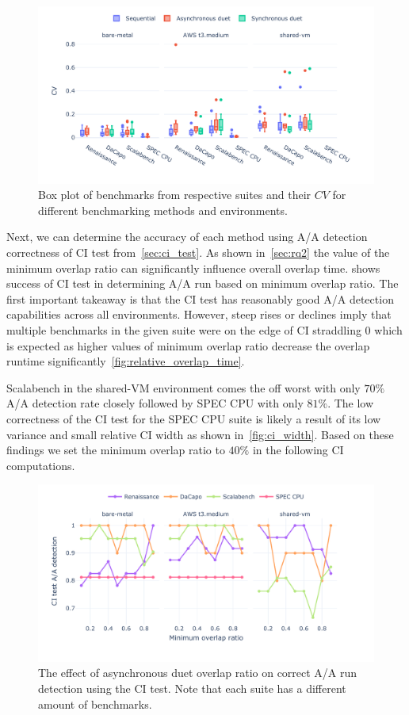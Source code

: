 \begin{figure}
	\centering
	\includegraphics[width=1\linewidth]{./figures/cv.pdf}
	\caption{
		Box plot of benchmarks from respective suites and their $CV$ for different benchmarking methods and environments.
	}
	\label{fig:cv}
\end{figure}

Next, we can determine the accuracy of each method using A/A detection correctness of CI test from~\cref{sec:ci_test}.
As shown in~\cref{sec:rq2} the value of the minimum overlap ratio can significantly influence overall overlap time.
 shows success of CI test in determining A/A run based on minimum overlap ratio.
The first important takeaway is that the CI test has reasonably good A/A detection capabilities across all environments.
However, steep rises or declines imply that multiple benchmarks in the given suite were on the edge of CI straddling $0$ which is expected as higher values of minimum overlap ratio decrease the overlap runtime significantly~\ref{fig:relative_overlap_time}.

Scalabench in the \mbox{shared-VM} environment comes the off worst with only $70\%$ A/A detection rate closely followed by SPEC CPU with only $81\%$.
The low correctness of the CI test for the SPEC CPU suite is likely a result of its low variance and small relative CI width as shown in~\cref{fig:ci_width}.
Based on these findings we set the minimum overlap ratio to $40\%$ in the following CI computations.

\begin{figure}
	\centering
	\includegraphics[width=1\linewidth]{./figures/citest_aa_match_by_overlap.pdf}
	\caption{
		The effect of asynchronous duet overlap ratio on correct A/A run detection using the CI test.
		Note that each suite has a different amount of benchmarks.
	}
	\label{fig:citest_overlap_aa}
\end{figure}

